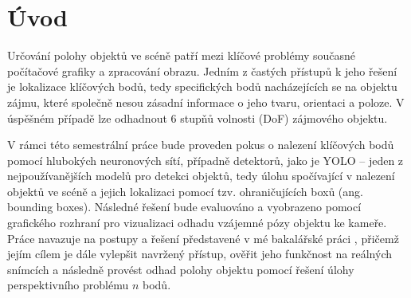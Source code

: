\chapter{Úvod}
\label{sec:Introduction}
Určování polohy objektů ve scéně patří mezi klíčové problémy současné počítačové grafiky a zpracování obrazu. Jedním z častých přístupů k jeho řešení je lokalizace klíčových bodů, tedy specifických bodů nacházejících se na objektu zájmu, které společně nesou zásadní informace o jeho tvaru, orientaci a poloze. V úspěšném případě lze odhadnout 6 stupňů volnosti (DoF) zájmového objektu.

V rámci této semestrální práce bude proveden pokus o nalezení klíčových bodů pomocí hlubokých neuronových sítí, případně detektorů, jako je YOLO – jeden z nejpoužívanějších modelů pro detekci objektů, tedy úlohu spočívající v nalezení objektů ve scéně a jejich lokalizaci pomocí tzv. ohraničujících boxů (ang. bounding boxes). Následné řešení bude evaluováno a vyobrazeno pomocí grafického rozhraní pro vizualizaci odhadu vzájemné pózy objektu ke kameře. Práce navazuje na postupy a řešení představené v mé bakalářské práci \cite{mojebp}, přičemž jejím cílem je dále vylepšit navržený přístup, ověřit jeho funkčnost na reálných snímcích a následně provést odhad polohy objektu pomocí řešení úlohy perspektivního problému $n$ bodů.
